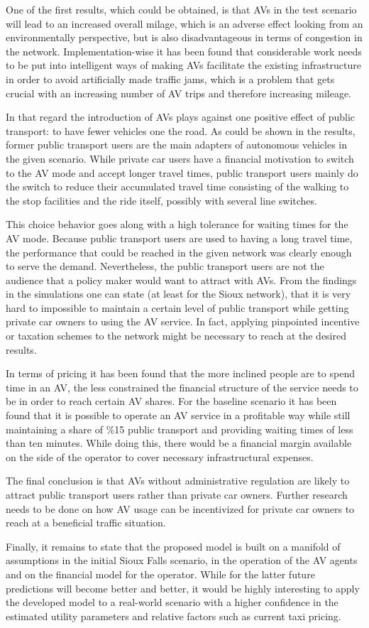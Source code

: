 One of the first results, which could be obtained, is that AVs in the test
scenario will lead to an increased overall milage, which is an adverse effect
looking from an environmentally perspective, but is also disadvantageous in
terms of congestion in the network. Implementation-wise it has been found that
considerable work needs to be put into intelligent ways of making AVs facilitate
the existing infrastructure in order to avoid artificially made traffic jams,
which is a problem that gets crucial with an increasing number of AV trips
and therefore increasing mileage.

In that regard the introduction of AVs plays against one positive effect of
public transport: to have fewer vehicles one the road. As could be shown in the
results, former public transport users are the main adapters of autonomous vehicles
in the given scenario. While private car users have a financial motivation to switch
to the AV mode and accept longer travel times, public transport users mainly do
the switch to reduce their accumulated travel time consisting of the walking
to the stop facilities and the ride itself, possibly with several line switches.

This choice behavior goes along with a high tolerance for waiting times for the
AV mode. Because public transport users are used to having a long travel time,
the performance that could be reached in the given network was clearly enough
to serve the demand. Nevertheless, the public transport users are not the
audience that a policy maker would want to attract with AVs. From the findings
in the simulations one can state (at least for the Sioux network), that it is
very hard to impossible to maintain a certain level of public transport while
getting private car owners to using the AV service. In fact, applying pinpointed
incentive or taxation schemes to the network might be necessary to reach at the
desired results.

In terms of pricing it has been found that the more inclined people are to spend
time in an AV, the less constrained the financial structure of the service needs
to be in order to reach certain AV shares. For the baseline scenario it has been
found that it is possible to operate an AV service in a profitable way while still
maintaining a share of \%15 public transport and providing waiting times of less
than ten minutes. While doing this, there would be a financial margin available
on the side of the operator to cover necessary infrastructural expenses.

The final conclusion is that AVs without administrative regulation are likely to
attract public transport users rather than private car owners. Further research
needs to be done on how AV usage can be incentivized for private car owners to
reach at a beneficial traffic situation.

Finally, it remains to state that the proposed model is built on a manifold of
assumptions in the initial Sioux Falls scenario, in the operation of the AV
agents and on the financial model for the operator. While for the latter future
predictions will become better and better, it would be highly interesting to apply
the developed model to a real-world scenario with a higher confidence in the estimated
utility parameters and relative factors such as current taxi pricing.
